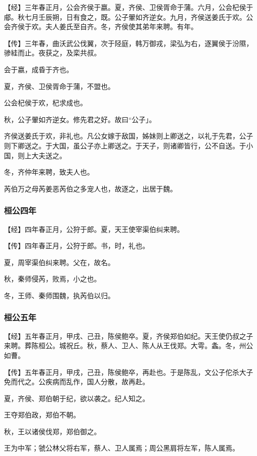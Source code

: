 \documentclass[]{article}
\begin{document}
【经】三年春正月，公会齐侯于嬴。夏，齐侯、卫侯胥命于蒲。六月，公会杞侯于郕。秋七月壬辰朔，日有食之，既。公子翬如齐逆女。九月，齐侯送姜氏于欢。公会齐侯于欢。夫人姜氏至自齐。冬，齐侯使其弟年来聘。有年。

【传】三年春，曲沃武公伐翼，次于陉庭，韩万御戎，梁弘为右，逐翼侯于汾隰，骖絓而止。夜获之，及栾共叔。

会于嬴，成昏于齐也。

夏，齐侯、卫侯胥命于蒲，不盟也。

公会杞侯于欢，杞求成也。

秋，公子翬如齐逆女。修先君之好。故曰``公子」。

齐侯送姜氏于欢，非礼也。凡公女嫁于敌国，姊妹则上卿送之，以礼于先君，公子则下卿送之。于大国，虽公子亦上卿送之。于天子，则诸卿皆行，公不自送。于小国，则上大夫送之。

冬，齐仲年来聘，致夫人也。

芮伯万之母芮姜恶芮伯之多宠人也，故逐之，出居于魏。

\hypertarget{header-n198}{%
\subsubsection{桓公四年}\label{header-n198}}

【经】四年春正月，公狩于郎。夏，天王使宰渠伯纠来聘。

【传】四年春正月，公狩于郎。书，时，礼也。

夏，周宰渠伯纠来聘。父在，故名。

秋，秦师侵芮，败焉，小之也。

冬，王师、秦师围魏，执芮伯以归。

\hypertarget{header-n206}{%
\subsubsection{桓公五年}\label{header-n206}}

【经】五年春正月，甲戌、己丑，陈侯鲍卒。夏，齐侯郑伯如纪。天王使仍叔之子来聘。葬陈桓公。城祝丘。秋，蔡人、卫人、陈人从王伐郑。大雩。螽。冬，州公如曹。

【传】五年春正月，甲戌，己丑，陈侯鲍卒，再赴也。于是陈乱，文公子佗杀大子免而代之。公疾病而乱作，国人分散，故再赴。

夏，齐侯、郑伯朝于纪，欲以袭之。纪人知之。

王夺郑伯政，郑伯不朝。

秋，王以诸侯伐郑，郑伯御之。

王为中军；虢公林父将右军，蔡人、卫人属焉；周公黑肩将左军，陈人属焉。
\end{document}
